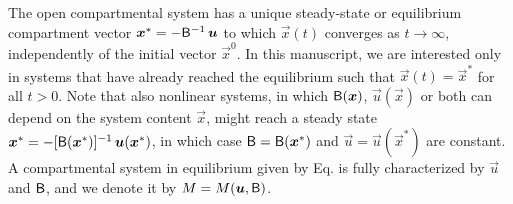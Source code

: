 \documentclass[smallextended]{svjour3}
\makeatletter
\renewcommand*{\eqref}[1]{%
  \hyperref[{#1}]{\textup{\tagform@{\ref*{#1}}}}%
}
\makeatother
\begin{document}
The open compartmental system \eqref{eqn:lin_CS_sys} has a unique steady-state or equilibrium compartment vector $\vec{x}^\ast = -\tens{B}^{-1}\,\vec{u}$ to which $\vec{x}(t)$ converges as $t\to\infty$, independently of the initial vector $\vec{x}^0$.
In this manuscript, we are interested only in systems that have already reached the equilibrium such that $\vec{x}(t)=\vec{x}^\ast$ for all $t>0$.
Note that also nonlinear systems, in which $\tens{B}(\vec{x})$, $\vec{u}(\vec{x})$ or both can depend on the system content $\vec{x}$, might reach a steady state $\vec{x}^\ast = -[\tens{B}(\vec{x}^\ast)]^{-1}\,\vec{u}(\vec{x}^\ast)$, in which case $\tens{B}=\tens{B}(\vec{x}^\ast)$ and $\vec{u}=\vec{u}(\vec{x}^\ast)$ are constant.
A compartmental system in equilibrium given by Eq. \eqref{eqn:lin_CS_sys} is fully characterized by $\vec{u}$ and $\mathsf{B}$, and we denote it by $M=M(\vec{u},\tens{B})$.
\end{document}
